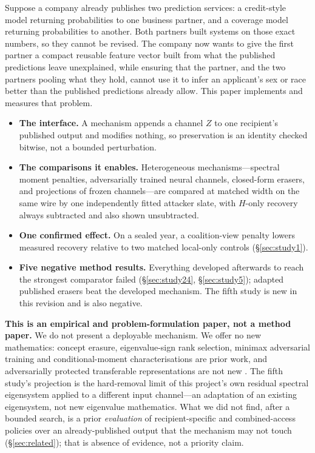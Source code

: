 \documentclass[10pt]{article}
\begin{document}
Suppose a company already publishes two prediction services: a credit-style model returning
probabilities to one business partner, and a coverage model returning probabilities to another. Both
partners built systems on those exact numbers, so they cannot be revised. The company now wants to give
the first partner a compact reusable feature vector built from what the published predictions leave
unexplained, while ensuring that the partner, and the two partners pooling what they hold, cannot use it
to infer an applicant's sex or race better than the published predictions already allow. This paper
implements and measures that problem.

\begin{itemize}\itemsep1pt
\item \textbf{The interface.} A mechanism appends a channel $Z$ to one recipient's published output and
modifies nothing, so preservation is an identity checked bitwise, not a bounded perturbation.
\item \textbf{The comparisons it enables.} Heterogeneous mechanisms---spectral moment penalties,
adversarially trained neural channels, closed-form erasers, and projections of frozen channels---are
compared at matched width on the same wire by one independently fitted attacker slate, with $H$-only
recovery always subtracted and also shown unsubtracted.
\item \textbf{One confirmed effect.} On a sealed year, a coalition-view penalty lowers measured recovery
relative to two matched local-only controls (\S\ref{sec:study1}).
\item \textbf{Five negative method results.} Everything developed afterwards to reach the strongest
comparator failed (\S\ref{sec:study24}, \S\ref{sec:study5}); adapted published erasers beat the developed
mechanism. The fifth study is new in this revision and is also negative.
\end{itemize}

\textbf{This is an empirical and problem-formulation paper, not a method paper.} We do not present a
deployable mechanism. We offer no new mathematics: concept erasure, eigenvalue-sign rank selection,
minimax adversarial training and conditional-moment characterisations are prior work, and adversarially
protected transferable representations are not new \citep{madras2018laftr}. The fifth study's projection
is the hard-removal limit of this project's own residual spectral eigensystem applied to a different
input channel---an adaptation of an existing eigensystem, not new eigenvalue mathematics. What we did
not find, after a bounded search, is a prior \emph{evaluation} of recipient-specific and combined-access
policies over an already-published output that the mechanism may not touch (\S\ref{sec:related}); that
is absence of evidence, not a priority claim.
\end{document}
